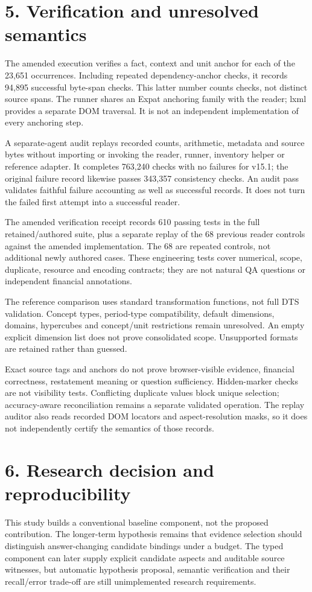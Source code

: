 \documentclass[10pt,a4paper]{article}
\begin{document}
\clearpage
\section*{5. Verification and unresolved semantics}
The amended execution verifies a fact, context and unit anchor for each of the 23,651 occurrences. Including repeated dependency-anchor checks, it records 94,895 successful byte-span checks. This latter number counts checks, not distinct source spans. The runner shares an Expat anchoring family with the reader; lxml provides a separate DOM traversal. It is not an independent implementation of every anchoring step.

A separate-agent audit replays recorded counts, arithmetic, metadata and source bytes without importing or invoking the reader, runner, inventory helper or reference adapter. It completes 763,240 checks with no failures for v15.1; the original failure record likewise passes 343,357 consistency checks. An audit pass validates faithful failure accounting as well as successful records. It does not turn the failed first attempt into a successful reader.

The amended verification receipt records 610 passing tests in the full retained/authored suite, plus a separate replay of the 68 previous reader controls against the amended implementation. The 68 are repeated controls, not additional newly authored cases. These engineering tests cover numerical, scope, duplicate, resource and encoding contracts; they are not natural QA questions or independent financial annotations.

The reference comparison uses standard transformation functions, not full DTS validation. Concept types, period-type compatibility, default dimensions, domains, hypercubes and concept/unit restrictions remain unresolved. An empty explicit dimension list does not prove consolidated scope. Unsupported formats are retained rather than guessed.

Exact source tags and anchors do not prove browser-visible evidence, financial correctness, restatement meaning or question sufficiency. Hidden-marker checks are not visibility tests. Conflicting duplicate values block unique selection; accuracy-aware reconciliation remains a separate validated operation. The replay auditor also reads recorded DOM locators and aspect-resolution masks, so it does not independently certify the semantics of those records.

\clearpage
\section*{6. Research decision and reproducibility}
This study builds a conventional baseline component, not the proposed contribution. The longer-term hypothesis remains that evidence selection should distinguish answer-changing candidate bindings under a budget. The typed component can later supply explicit candidate aspects and auditable source witnesses, but automatic hypothesis proposal, semantic verification and their recall/error trade-off are still unimplemented research requirements.
\end{document}
